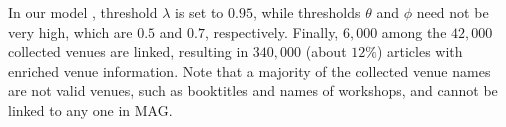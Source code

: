{In our model \ewpr, threshold $\lambda$ is set to $0.95$, while thresholds $\theta$ and $\phi$ need not be very high, which are $0.5$ and $0.7$, respectively. Finally, $6,000$ among the $42,000$ collected venues are linked, resulting in $340,000$ (about $12\%$) articles with enriched venue information. Note that a majority of the collected venue names are not valid venues, such as booktitles and names of workshops, and cannot be linked to any one in MAG.
}


